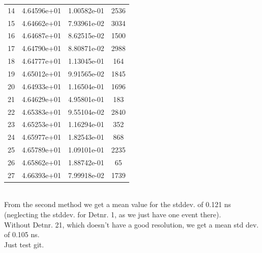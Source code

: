 \documentclass[12pt, letterpaper]{article}
\begin{document}
\begin{appendices}
\begin{enumerate}
\begin{tabular}{|c|c|c|c|}
14  &  4.64596e+01  &  1.00582e-01   &  2536 \\       
15  &  4.64662e+01  &  7.93961e-02   &  3034 \\        
16  &  4.64687e+01  &  8.62515e-02   &  1500 \\      
17  &  4.64790e+01  &  8.80871e-02   &  2988 \\     
18  &  4.64777e+01  &  1.13045e-01   &  164  \\       
19  &  4.65012e+01  &  9.91565e-02   &  1845 \\   
20  &  4.64933e+01  &  1.16504e-01   &  1696 \\     
21  &  4.64629e+01  &  4.95801e-01   &  183  \\        
22  &  4.65383e+01  &  9.55104e-02   &  2840 \\        
23  &  4.65253e+01  &  1.16294e-01   &  352  \\     
24  &  4.65977e+01  &  1.82543e-01   &  868  \\        
25  &  4.65789e+01  &  1.09101e-01   &  2235 \\        
26  &  4.65862e+01  &  1.88742e-01   &  65   \\    
27  &  4.66393e+01  &  7.99918e-02   &  1739 \\      
\hline
\end{tabular}
\newline
\\
From the second method we get a mean value for the std\textunderscore dev. of 0.121 ns (neglecting the std\textunderscore dev. for Detnr. 1, as we just have one event there).\\
Without Detnr. 21, which doesn't have a good resolution, we get a mean std \textunderscore dev. of 0.105 ns.\\
Just test git.
\end{enumerate}
\end{appendices}
\end{document}
